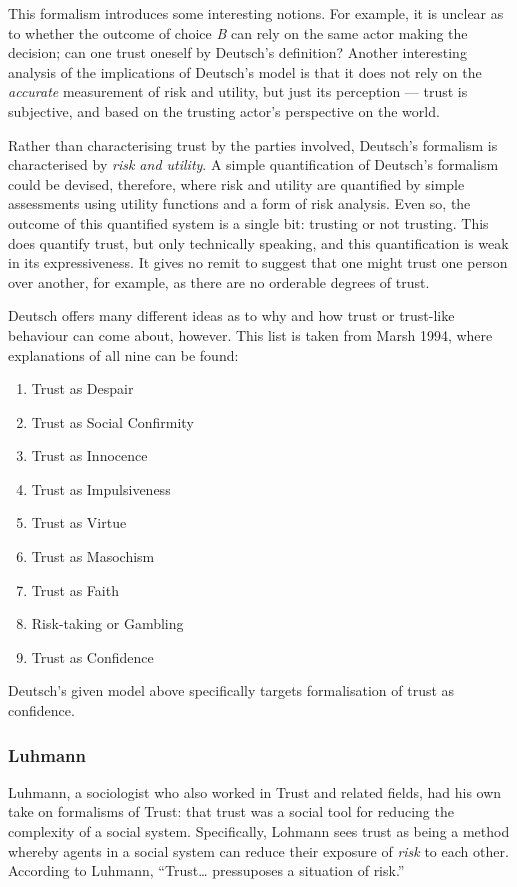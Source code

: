 This formalism introduces some interesting notions. For example, it is unclear as to whether the outcome of choice \emph{B} can rely on the same actor making the decision; can one trust oneself by Deutsch's definition? Another interesting analysis of the implications of Deutsch's model is that it does not rely on the \emph{accurate} measurement of risk and utility, but just its perception --- trust is subjective, and based on the trusting actor's perspective on the world.

Rather than characterising trust by the parties involved, Deutsch's formalism is characterised by \emph{risk and utility}. A simple quantification of Deutsch's formalism could be devised, therefore, where risk and utility are quantified by simple assessments using utility functions and a form of risk analysis. Even so, the outcome of this quantified system is a single bit: trusting or not trusting. This does quantify trust, but only technically speaking, and this quantification is weak in its expressiveness. It gives no remit to suggest that one might trust one person over another, for example, as there are no orderable degrees of trust.

Deutsch offers many different ideas as to why and how trust or trust-like behaviour can come about, however. This list is taken from Marsh 1994\cite{Marsh1994FormalisingConcept}, where explanations of all nine can be found:

\begin{enumerate}
    \item Trust as Despair
    \item Trust as Social Confirmity
    \item Trust as Innocence
    \item Trust as Impulsiveness
    \item Trust as Virtue
    \item Trust as Masochism
    \item Trust as Faith
    \item Risk-taking or Gambling
    \item Trust as Confidence
\end{enumerate}

Deutsch's given model above specifically targets formalisation of trust as confidence.

\subsubsection{Luhmann}
Luhmann, a sociologist who also worked in Trust and related fields, had his own take on formalisms of Trust: that trust was a social tool for reducing the complexity of a social system. Specifically, Lohmann sees trust as being a method whereby agents in a social system can reduce their exposure of \emph{risk} to each other. According to Luhmann, ``Trust{\ldots} pressuposes a situation of risk.''\par

